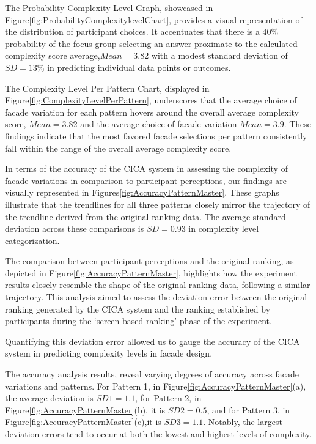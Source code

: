 
The Probability Complexity Level Graph, showcased in Figure\ref{fig:ProbabilityComplexitylevelChart}, provides a visual representation of the distribution of participant choices.
It accentuates that there is a \(40\%\) probability of the focus group selecting an answer proximate to the calculated complexity score average,\(Mean = 3.82\) with a modest standard deviation of \(SD = 13\%\) in predicting individual data points or outcomes.


The Complexity Level Per Pattern Chart, displayed in Figure\ref{fig:ComplexityLevelPerPattern}, underscores that the average choice of facade variation for each pattern hovers around the overall average complexity score, \(Mean = 3.82\) and the average choice of facade variation \(Mean = 3.9\).
These findings indicate that the most favored facade selections per pattern consistently fall within the range of the overall average complexity score.


In terms of the accuracy of the CICA system in assessing the complexity of facade variations in comparison to participant perceptions, our findings are visually represented in Figures\ref{fig:AccuracyPatternMaster}.
These graphs illustrate that the trendlines for all three patterns closely mirror the trajectory of the trendline derived from the original ranking data.
The average standard deviation across these comparisons is \(SD = 0.93\) in complexity level categorization.


The comparison between participant perceptions and the original ranking, as depicted in Figure\ref{fig:AccuracyPatternMaster}, highlights how the experiment results closely resemble the shape of the original ranking data, following a similar trajectory.
This analysis aimed to assess the deviation error between the original ranking generated by the CICA system and the ranking established by participants during the `screen-based ranking' phase of the experiment.

Quantifying this deviation error allowed us to gauge the accuracy of the CICA system in predicting complexity levels in facade design.

The accuracy analysis results, reveal varying degrees of accuracy across facade variations and patterns.
For Pattern 1, in Figure\ref{fig:AccuracyPatternMaster}(a), the average deviation is \(SD1 = 1.1\), for Pattern 2, in Figure\ref{fig:AccuracyPatternMaster}(b), it is \(SD2 = 0.5\), and for Pattern 3, in Figure\ref{fig:AccuracyPatternMaster}(c),it is \(SD3 = 1.1\).
Notably, the largest deviation errors tend to occur at both the lowest and highest levels of complexity.


